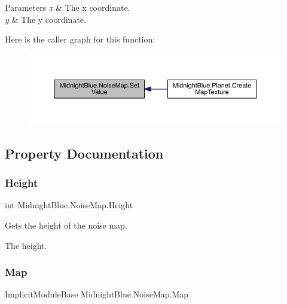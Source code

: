 \begin{DoxyParams}{Parameters}
{\em x} & The x coordinate.\\
\hline
{\em y} & The y coordinate.\\
\hline
\end{DoxyParams}
Here is the caller graph for this function\+:\nopagebreak
\begin{figure}[H]
\begin{center}
\leavevmode
\includegraphics[width=350pt]{class_midnight_blue_1_1_noise_map_a26d94cbea4c0377833bed064cbd36496_icgraph}
\end{center}
\end{figure}


\subsection{Property Documentation}
\hypertarget{class_midnight_blue_1_1_noise_map_abfffdfa7bb7a696e495bbfb2e6ac0c57}{}\label{class_midnight_blue_1_1_noise_map_abfffdfa7bb7a696e495bbfb2e6ac0c57} 
\subsubsection{\texorpdfstring{Height}{Height}}
{\footnotesize\ttfamily int Midnight\+Blue.\+Noise\+Map.\+Height\hspace{0.3cm}{\ttfamily [get]}}



Gets the height of the noise map. 

The height.\hypertarget{class_midnight_blue_1_1_noise_map_a428d013274d19ed0775adc6d32f00719}{}\label{class_midnight_blue_1_1_noise_map_a428d013274d19ed0775adc6d32f00719} 
\subsubsection{\texorpdfstring{Map}{Map}}
{\footnotesize\ttfamily Implicit\+Module\+Base Midnight\+Blue.\+Noise\+Map.\+Map\hspace{0.3cm}{\ttfamily [get]}}




